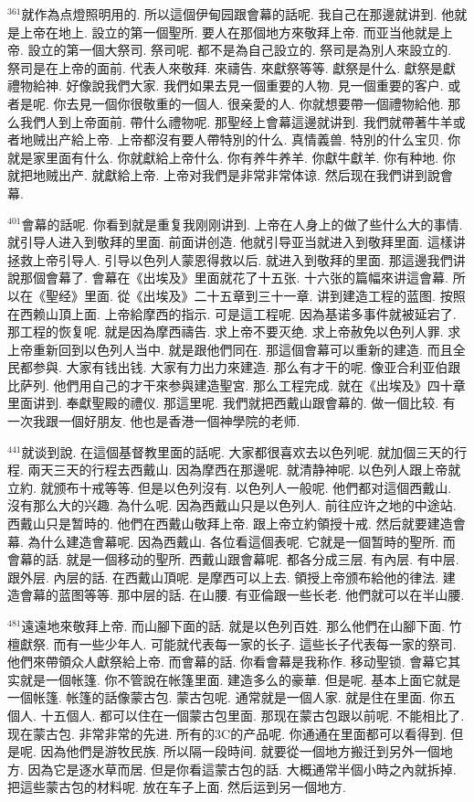\documentclass{book}
\begin{document}
$^{361}$就作為点燈照明用的.
所以這個伊甸园跟會幕的話呢.
我自己在那邊就讲到.
他就是上帝在地上.
設立的第一個聖所.
要人在那個地方來敬拜上帝.
而亚当他就是上帝.
設立的第一個大祭司.
祭司呢.
都不是為自己設立的.
祭司是為別人來設立的.
祭司是在上帝的面前.
代表人來敬拜.
來禱告.
來獻祭等等.
獻祭是什么.
獻祭是獻禮物給神.
好像說我們大家.
我們如果去見一個重要的人物.
見一個重要的客户.
或者是呢.
你去見一個你很敬重的一個人.
很亲愛的人.
你就想要帶一個禮物給他.
那么我們人到上帝面前.
帶什么禮物呢.
那聖经上會幕這邊就讲到.
我們就帶著牛羊或者地贼出产給上帝.
上帝都沒有要人帶特別的什么.
真情義兽.
特別的什么宝贝.
你就是家里面有什么.
你就獻給上帝什么.
你有养牛养羊.
你獻牛獻羊.
你有种地.
你就把地贼出产.
就獻給上帝.
上帝对我們是非常非常体谅.
然后现在我們讲到說會幕.

$^{401}$會幕的話呢.
你看到就是重复我刚刚讲到.
上帝在人身上的做了些什么大的事情.
就引导人进入到敬拜的里面.
前面讲创造.
他就引导亚当就进入到敬拜里面.
這樣讲拯救上帝引导人.
引导以色列人蒙恩得救以后.
就进入到敬拜的里面.
那這邊我們讲說那個會幕了.
會幕在《出埃及》里面就花了十五张.
十六张的篇幅來讲這會幕.
所以在《聖经》里面.
從《出埃及》二十五章到三十一章.
讲到建造工程的蓝图.
按照在西赖山頂上面.
上帝給摩西的指示.
可是這工程呢.
因為基诺多事件就被延宕了.
那工程的恢复呢.
就是因為摩西禱告.
求上帝不要灭绝.
求上帝赦免以色列人罪.
求上帝重新回到以色列人当中.
就是跟他們同在.
那這個會幕可以重新的建造.
而且全民都参與.
大家有钱出钱.
大家有力出力來建造.
那么有才干的呢.
像亚合利亚伯跟比萨列.
他們用自己的才干來参與建造聖宮.
那么工程完成.
就在《出埃及》四十章里面讲到.
奉獻聖殿的禮仪.
那這里呢.
我們就把西戴山跟會幕的.
做一個比较.
有一次我跟一個好朋友.
他也是香港一個神學院的老师.

$^{441}$就谈到說.
在這個基督教里面的話呢.
大家都很喜欢去以色列呢.
就加個三天的行程.
兩天三天的行程去西戴山.
因為摩西在那邊呢.
就清静神呢.
以色列人跟上帝就立約.
就颁布十戒等等.
但是以色列沒有.
以色列人一般呢.
他們都对這個西戴山.
沒有那么大的兴趣.
為什么呢.
因為西戴山只是以色列人.
前往应许之地的中途站.
西戴山只是暂時的.
他們在西戴山敬拜上帝.
跟上帝立約領授十戒.
然后就要建造會幕.
為什么建造會幕呢.
因為西戴山.
各位看這個表呢.
它就是一個暂時的聖所.
而會幕的話.
就是一個移动的聖所.
西戴山跟會幕呢.
都各分成三层.
有內层.
有中层.
跟外层.
內层的話.
在西戴山頂呢.
是摩西可以上去.
領授上帝颁布給他的律法.
建造會幕的蓝图等等.
那中层的話.
在山腰.
有亚倫跟一些长老.
他們就可以在半山腰.

$^{481}$遠遠地來敬拜上帝.
而山腳下面的話.
就是以色列百姓.
那么他們在山腳下面.
竹檀獻祭.
而有一些少年人.
可能就代表每一家的长子.
這些长子代表每一家的祭司.
他們來帶領众人獻祭給上帝.
而會幕的話.
你看會幕是我称作.
移动聖锁.
會幕它其实就是一個帐篷.
你不管說在帐篷里面.
建造多么的豪華.
但是呢.
基本上面它就是一個帐篷.
帐篷的話像蒙古包.
蒙古包呢.
通常就是一個人家.
就是住在里面.
你五個人.
十五個人.
都可以住在一個蒙古包里面.
那现在蒙古包跟以前呢.
不能相比了.
现在蒙古包.
非常非常的先进.
所有的3C的产品呢.
你通通在里面都可以看得到.
但是呢.
因為他們是游牧民族.
所以隔一段時间.
就要從一個地方搬迁到另外一個地方.
因為它是逐水草而居.
但是你看這蒙古包的話.
大概通常半個小時之內就拆掉.
把這些蒙古包的材料呢.
放在车子上面.
然后运到另一個地方.
\end{document}

